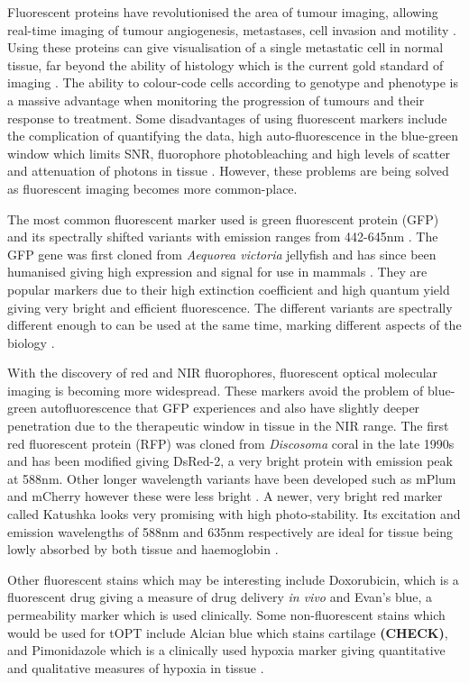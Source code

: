 \documentclass[12pt]{article}
\begin{document}
Fluorescent proteins have revolutionised the area of tumour imaging, allowing real-time imaging of tumour angiogenesis, metastases, cell invasion and motility \cite{Hoffman:2005}. Using these proteins can give visualisation of a single metastatic  cell in normal tissue, far beyond the ability of histology which is the current gold standard of imaging \cite{Hoffman:2009}. The ability to colour-code cells according to genotype and phenotype is a massive advantage when monitoring the progression of tumours and their response to treatment.
Some disadvantages of using fluorescent markers include the complication of  quantifying the data, high auto-fluorescence in the blue-green window which limits SNR, fluorophore photobleaching and high levels of scatter and attenuation of photons in tissue \cite{Gross:2005}. However, these problems are being solved as fluorescent imaging becomes more common-place. 


The most common fluorescent marker used is  green fluorescent protein (GFP) and its spectrally shifted variants with emission ranges from 442-645nm \cite{Hoffman:2005}. The GFP gene was first cloned from \textit{Aequorea victoria} jellyfish and has since been humanised giving high expression and signal for use in mammals \cite{Hoffman:2009}. They are popular markers due to their high extinction coefficient and high quantum yield giving very bright and efficient fluorescence. The different variants are spectrally different enough to can be used at the same time, marking different aspects of the biology \cite{Hoffman:2005}. 

With the discovery of red and NIR fluorophores, fluorescent optical molecular imaging is becoming  more widespread. These markers avoid the problem of blue-green autofluorescence that GFP experiences and also have slightly deeper penetration due to the therapeutic window in tissue in the NIR range. The first red fluorescent protein (RFP) was cloned from \textit{Discosoma} coral in the late 1990s and has been modified giving DsRed-2, a very bright protein with emission peak at 588nm. Other longer wavelength variants have been developed such as mPlum and mCherry however these were less bright \cite{Hoffman:2009}. A newer, very bright red marker called Katushka looks very promising with high photo-stability. Its excitation and emission wavelengths of 588nm and 635nm respectively are ideal for tissue being lowly absorbed by both tissue and haemoglobin \cite{Shcherbo:2007}.
 

Other fluorescent stains which may be interesting include  Doxorubicin, which is a fluorescent drug  giving a measure of drug delivery \textit{in vivo} and Evan's blue, a permeability marker which is used clinically. 
Some non-fluorescent stains which would be used for tOPT include Alcian blue which stains cartilage \textbf{(CHECK)}, and Pimonidazole which is a clinically used hypoxia marker giving quantitative and qualitative measures of hypoxia in tissue \cite{Varia:1998}. 
\end{document}
